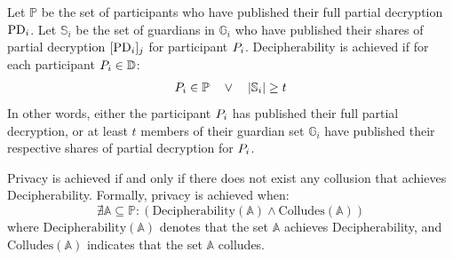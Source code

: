 \documentclass[runningheads]{llncs}
\begin{document}



\begin{definition}[Decipherability] \label{def:decipherability}
    Let $\mathbb{P}$ be the set of participants who have published their full partial decryption $\mathrm{PD}_{i}$. Let $\mathbb{S}_i$ be the set of guardians in $\mathbb{G}_i$ who have published their shares of partial decryption $[\mathrm{PD}_{i}]_{j}$ for participant $P_{i}$. Decipherability is achieved if for each participant $P_{i} \in \mathbb{D}$:
    \begin{align*}
    P_{i} \in \mathbb{P} \quad \lor \quad |\mathbb{S}_i| \geq t
    \end{align*}
    In other words, either the participant $P_{i}$ has published their full partial decryption, or at least $t$ members of their guardian set $\mathbb{G}_i$ have published their respective shares of partial decryption for $P_{i}$.
\end{definition}



\begin{definition}[Privacy] \label{def:privacy}
    Privacy is achieved if and only if there does not exist any collusion that achieves Decipherability. Formally, privacy is achieved when:
    \[
    \nexists \mathbb{A} \subseteq \mathbb{P} : (\text{Decipherability}(\mathbb{A}) \land \text{Colludes}(\mathbb{A}))
    \]
    where \( \text{Decipherability}(\mathbb{A}) \) denotes that the set \( \mathbb{A} \) achieves Decipherability, and \( \text{Colludes}(\mathbb{A}) \) indicates that the set \( \mathbb{A} \) colludes.
\end{definition}
\end{document}
